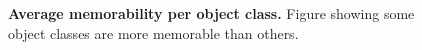 %

\begin{figure}[t]
\centering
{}
\vspace{-5mm}\caption{\footnotesize\textbf{Average memorability per object class.} Figure showing some object classes are more memorable than others. }\label{fig:avgMem}
\end{figure} 
